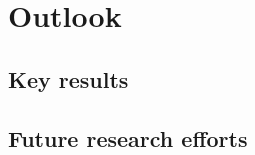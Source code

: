 \chapter{Outlook}
\label{chap:outlook}

\section{Key results}
\label{sec:results}

\section{Future research efforts}
\label{sec:future}
